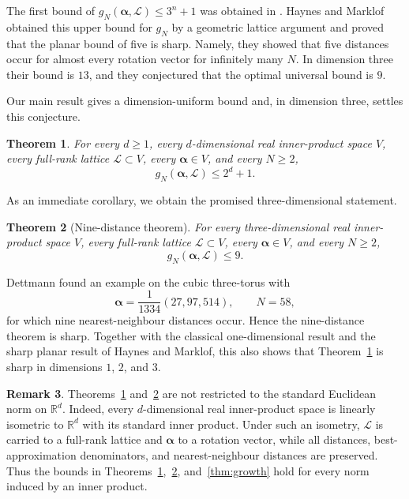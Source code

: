\documentclass[11pt,reqno]{amsart}
\newtheorem{theorem}{Theorem}[section]
\theoremstyle{definition}
\newtheorem{remark}[theorem]{Remark}
\newcommand{\R}{\mathbb R}
\newcommand{\0}{\mbf 0}%
\def\R{\mathbb R}
\newcommand{\cL}{\mathcal L}
\newcommand{\balpha}{\boldsymbol{\alpha}}
\begin{document}
The first bound of $g_N(\balpha,\cL)\leq 3^n+1$ was obtained in \cite{MR2443351}. Haynes and Marklof \cite{HaynesMarklof2022} obtained this upper bound for $g_N$ by a geometric lattice
argument and proved that the planar bound of five is sharp. Namely, they showed that five distances
occur for almost every rotation vector for infinitely many $N$. In dimension three their bound is $13$, and they
conjectured that the optimal universal bound is $9$.

Our main result gives a dimension-uniform bound and, in dimension three,
settles this conjecture.

\begin{theorem}\label{thm:main}
For every $d\ge1$, every $d$-dimensional real inner-product space $V$, every
full-rank lattice $\cL\subset V$, every $\balpha\in V$, and every $N\ge2$,
$$
 g_N(\balpha,\cL)\le2^d+1.
$$
\end{theorem}

As an immediate corollary, we obtain the promised three-dimensional
statement.

\begin{theorem}[Nine-distance theorem]\label{thm:nine-distance}
For every three-dimensional real inner-product space $V$, every full-rank
lattice $\cL\subset V$, every $\balpha\in V$, and every $N\ge2$,
$$
 g_N(\balpha,\cL)\le9.
$$
\end{theorem}

Dettmann \cite[Section~3.3]{Dettmann2025} found an example on the cubic
three-torus with
$$
 \balpha=\frac1{1334}(27,97,514),\qquad N=58,
$$
for which nine nearest-neighbour distances occur. Hence the nine-distance
theorem is sharp. Together with the classical one-dimensional result and the
sharp planar result of Haynes and Marklof, this also shows that
Theorem~\ref{thm:main} is sharp in dimensions $1$, $2$, and $3$.

\begin{remark}
Theorems~\ref{thm:main} and~\ref{thm:nine-distance} are not restricted to the
standard Euclidean norm on $\R^d$. Indeed, every $d$-dimensional real
inner-product space is linearly isometric to $\R^d$ with its standard inner
product. Under such an isometry, $\cL$ is carried to a full-rank lattice and
$\balpha$ to a rotation vector, while all distances, best-approximation
denominators, and nearest-neighbour distances are preserved. Thus the bounds
in Theorems~\ref{thm:main},~\ref{thm:nine-distance}, and~\ref{thm:growth}
hold for every norm induced by an inner product.
\end{remark}
\end{document}
